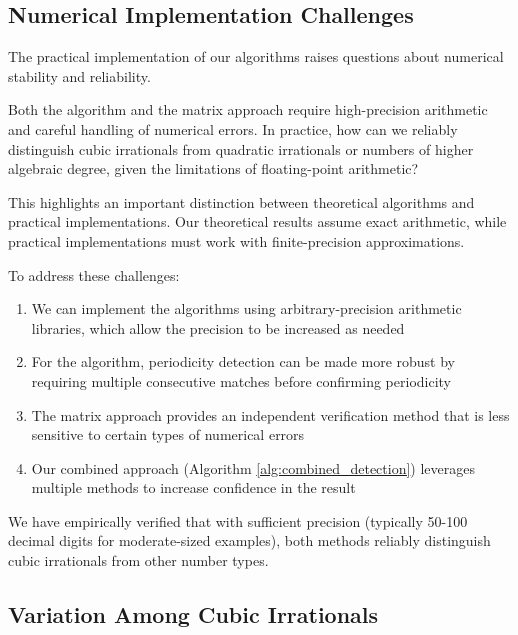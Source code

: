\subsection{Numerical Implementation Challenges}

The practical implementation of our algorithms raises questions about numerical stability and reliability.

\begin{objection}
Both the \HAPD{} algorithm and the matrix approach require high-precision arithmetic and careful handling of numerical errors. In practice, how can we reliably distinguish cubic irrationals from quadratic irrationals or numbers of higher algebraic degree, given the limitations of floating-point arithmetic?
\end{objection}

\begin{response}
This highlights an important distinction between theoretical algorithms and practical implementations. Our theoretical results assume exact arithmetic, while practical implementations must work with finite-precision approximations.

To address these challenges:
\begin{enumerate}
    \item We can implement the algorithms using arbitrary-precision arithmetic libraries, which allow the precision to be increased as needed
    \item For the \HAPD{} algorithm, periodicity detection can be made more robust by requiring multiple consecutive matches before confirming periodicity
    \item The matrix approach provides an independent verification method that is less sensitive to certain types of numerical errors
    \item Our combined approach (Algorithm \ref{alg:combined_detection}) leverages multiple methods to increase confidence in the result
\end{enumerate}

We have empirically verified that with sufficient precision (typically 50-100 decimal digits for moderate-sized examples), both methods reliably distinguish cubic irrationals from other number types.
\end{response}

\subsection{Variation Among Cubic Irrationals}

